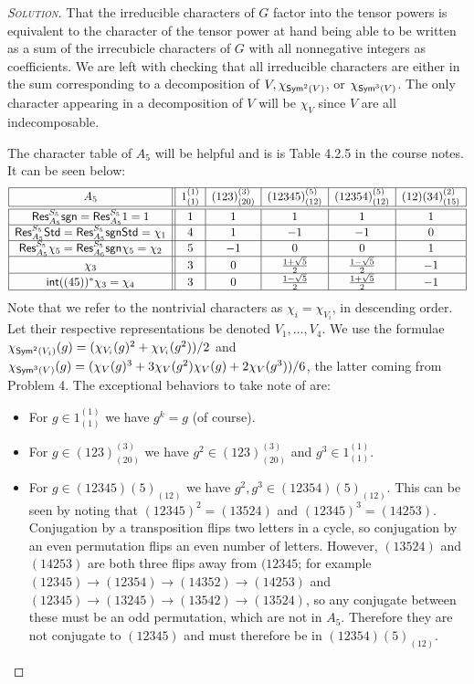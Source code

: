 \begin{proof}[{\scshape Solution}]
That the irreducible characters of $G$ factor into the tensor powers is equivalent to the character of the tensor power at hand being able to be written as a sum of the irrecubicle characters of $G$ with all nonnegative integers as coefficients. We are left with checking that all irreducible characters are either in the sum corresponding to a decomposition of $V, \chi_{\mathsf{Sym}^2(V)}$, or $\chi_{\mathsf{Sym}^3(V)}$. The only character appearing in a decomposition of $V$ will be $\chi_V$ since $V$ are all indecomposable.

 The character table of $A_5$ will be helpful and is is Table 4.2.5 in the course notes. It can be seen below:
\[
\begin{array}{|c||c|c|c|c|c|}
\hline A_{5} & 1_{(1)}^{(1)} & (123)_{(20)}^{(3)} & (12345)_{(12)}^{(5)} & (12354)_{(12)}^{(5)} & (12)(34)_{(15)}^{(2)} \\
\hline \hline \mathsf{Res}_{A_{5}}^{S_{5}} \mathsf{sgn}=\mathsf{Res}_{A_{5}}^{S_{5}} 1=1 & 1 & 1 & 1 & 1 & 1 \\
\hline \mathsf{Res}_{A_{5}}^{S_{5}} \mathsf{Std}=\mathsf{Res}_{A_{5}}^{S_{5}} \mathsf{sgn} \mathsf{Std}=\chi_{1} & 4 & 1 & -1 & -1 & 0 \\
\hline \mathsf{Res}_{A_{5}}^{S_{5}} \chi_{5}=\mathsf{Res}_{A_{6}}^{S_{5}} \mathsf{sgn} \chi_{5}=\chi_{2} & 5 & -1 & 0 & 0 & 1 \\
\hline \chi_{3} & 3 & 0 & \frac{1+\sqrt{5}}{2} & \frac{1-\sqrt{5}}{2} & -1 \\
\hline \mathsf{int}((45))^{*} \chi_{3}=\chi_{4} & 3 & 0 & \frac{1-\sqrt{5}}{2} & \frac{1+\sqrt{5}}{2} & -1 \\
\hline
\end{array}
\]
Note that we refer to the nontrivial characters as $\chi_i = \chi_{V_i}$, in descending order. Let their respective representations be denoted $V_1, \ldots, V_4$. We use the formulae $\chi_{\mathsf{Sym}^2(V_i)}(g) = (\chi_{V_i}(g)^2 + \chi_{V_i}(g^2))/2$ and $\chi_{\mathsf{Sym}^3(V)}(g) = (\chi_V(g)^3 + 3\chi_V(g^2)\chi_V(g) + 2 \chi_V(g^3))/6$, the latter coming from Problem 4. The exceptional behaviors to take note of are:
\begin{itemize}
   \item For $g \in 1^{(1)}_{(1)}$ we have $g^k = g$ (of course).
   \item For $g \in (123)^{(3)}_{(20)}$ we have $g^2 \in (123)^{(3)}_{(20)}$ and $g^3 \in 1^{(1)}_{(1)}$.
   \item For $g \in (12345){(5)}_{(12)}$ we have $g^2, g^3 \in (12354){(5)}_{(12)}$. This can be seen by noting that $(12345)^2 = (13524)$ and $(12345)^3 = (14253)$. Conjugation by a transposition flips two letters in a cycle, so conjugation by an even permutation flips an even number of letters. However, $(13524)$ and $(14253)$ are both three flips away from $(12345$; for example $(12345) \to (12354) \to (14352) \to (14253)$ and $(12345) \to (13245) \to (13542) \to (13524)$, so any conjugate between these must be an odd permutation, which are not in $A_5$. Therefore they are not conjugate to $(12345)$ and must therefore be in $(12354){(5)}_{(12)}$.

\end{itemize}
\end{proof}
